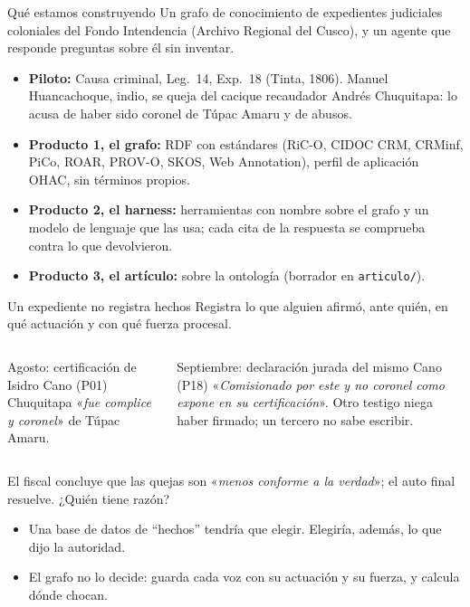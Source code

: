 \documentclass[aspectratio=169,10pt]{beamer}
\newcommand{\cita}[1]{«\textit{#1}»}
\newcommand{\ttt}[1]{\texttt{\small #1}}
\begin{document}
\begin{frame}{Qué estamos construyendo}
Un \alert{grafo de conocimiento} de expedientes judiciales coloniales del Fondo Intendencia (Archivo Regional del
Cusco), y un \alert{agente} que responde preguntas sobre él sin inventar.
\begin{itemize}
\item \textbf{Piloto:} Causa criminal, Leg.~14, Exp.~18 (Tinta, 1806). Manuel Huancachoque, indio, se queja del
      cacique recaudador Andrés Chuquitapa: lo acusa de haber sido coronel de Túpac Amaru y de abusos.
\item \textbf{Producto 1, el grafo:} RDF con estándares (RiC-O, CIDOC CRM, CRMinf, PiCo, ROAR, PROV-O, SKOS,
      Web Annotation), perfil de aplicación \alert{OHAC}, sin términos propios.
\item \textbf{Producto 2, el harness:} herramientas con nombre sobre el grafo y un modelo de lenguaje que las usa;
      cada cita de la respuesta se comprueba contra lo que devolvieron.
\item \textbf{Producto 3, el artículo:} sobre la ontología (borrador en \ttt{articulo/}).
\end{itemize}
\end{frame}

\begin{frame}{Un expediente no registra hechos}
Registra lo que \alert{alguien afirmó}, ante quién, en qué actuación y con qué fuerza procesal.
\begin{columns}[T]
\begin{block}{Agosto: certificación de Isidro Cano (P01)}
Chuquitapa \cita{fue complice y coronel} de Túpac Amaru.
\end{block}
\begin{block}{Septiembre: declaración jurada del mismo Cano (P18)}
\cita{Comisionado por este y no coronel como expone en su certificación}. Otro testigo niega haber firmado; un
tercero no sabe escribir.
\end{block}
\end{columns}
\medskip
El fiscal concluye que las quejas son \cita{menos conforme a la verdad}; el auto final resuelve. ¿Quién tiene razón?
\begin{itemize}\small
\item Una base de datos de \enquote{hechos} tendría que elegir. Elegiría, además, lo que dijo la autoridad.
\item \alert{El grafo no lo decide}: guarda cada voz con su actuación y su fuerza, y \alert{calcula} dónde chocan.
\end{itemize}
\end{frame}
\end{document}
